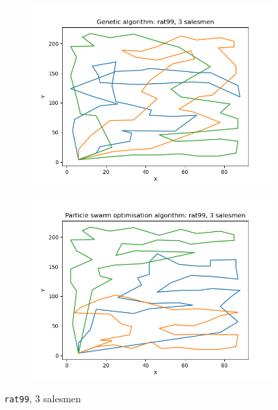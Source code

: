 \documentclass[conference]{IEEEtran}
\begin{document}
\begin{figure}[h]
    \centering
    \begin{subfigure}{.5\textwidth}
      \centering
      \includegraphics[width=\textwidth]{images/Genetic algorithm: rat99, 3 salesmen.png}
    \end{subfigure}%
    \begin{subfigure}{.5\textwidth}
      \centering
      \includegraphics[width=\textwidth]{images/Particle swarm optimisation algorithm: rat99, 3 salesmen.png}
    \end{subfigure}%
    \caption{\texttt{rat99}, 3 salesmen} \label{rat99, 3 salesmen}
\end{figure}
\end{document}

